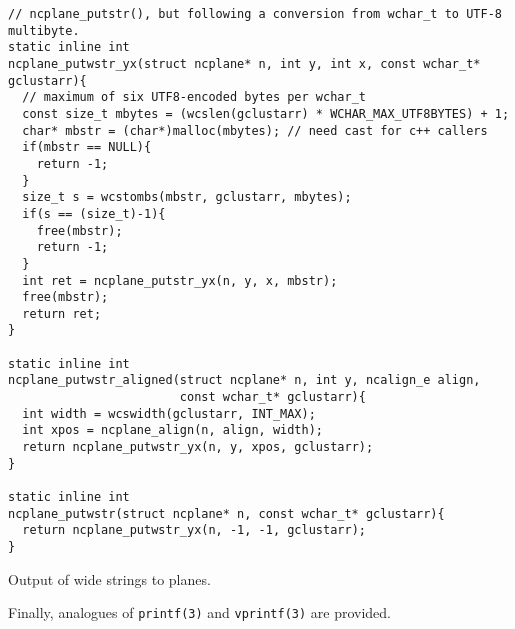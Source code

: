 \begin{listing}[!htbp]
\begin{verbatim}
// ncplane_putstr(), but following a conversion from wchar_t to UTF-8 multibyte.
static inline int
ncplane_putwstr_yx(struct ncplane* n, int y, int x, const wchar_t* gclustarr){
  // maximum of six UTF8-encoded bytes per wchar_t
  const size_t mbytes = (wcslen(gclustarr) * WCHAR_MAX_UTF8BYTES) + 1;
  char* mbstr = (char*)malloc(mbytes); // need cast for c++ callers
  if(mbstr == NULL){
    return -1;
  }
  size_t s = wcstombs(mbstr, gclustarr, mbytes);
  if(s == (size_t)-1){
    free(mbstr);
    return -1;
  }
  int ret = ncplane_putstr_yx(n, y, x, mbstr);
  free(mbstr);
  return ret;
}

static inline int
ncplane_putwstr_aligned(struct ncplane* n, int y, ncalign_e align,
                        const wchar_t* gclustarr){
  int width = wcswidth(gclustarr, INT_MAX);
  int xpos = ncplane_align(n, align, width);
  return ncplane_putwstr_yx(n, y, xpos, gclustarr);
}

static inline int
ncplane_putwstr(struct ncplane* n, const wchar_t* gclustarr){
  return ncplane_putwstr_yx(n, -1, -1, gclustarr);
}
\end{verbatim}
\caption{Output of wide strings to planes.}
\label{list:putc}
\end{listing}

Finally, analogues of \texttt{printf(3)} and \texttt{vprintf(3)} are provided.

